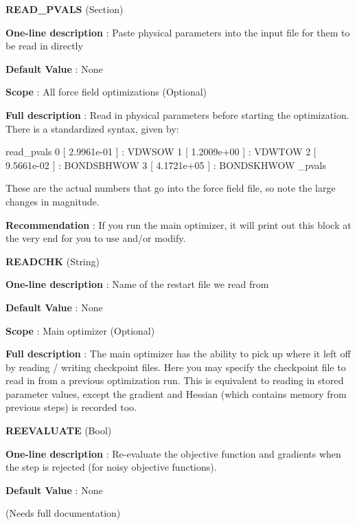 \begin{DoxyItemize}
\item {\bfseries  R\-E\-A\-D\-\_\-\-P\-V\-A\-L\-S } (Section) \par
{\bfseries  One-\/line description }\-: Paste physical parameters into the input file for them to be read in directly \par
{\bfseries  Default Value }\-: None \par
{\bfseries  Scope }\-: All force field optimizations (Optional) \par
{\bfseries  Full description }\-: Read in physical parameters before starting the optimization. There is a standardized syntax, given by\-: \begin{DoxyVerb}read_pvals
 0 [  2.9961e-01 ] : VDWSOW
 1 [  1.2009e+00 ] : VDWTOW
 2 [  9.5661e-02 ] : BONDSBHWOW
 3 [  4.1721e+05 ] : BONDSKHWOW
 \read_pvals \end{DoxyVerb}
 These are the actual numbers that go into the force field file, so note the large changes in magnitude. \par
{\bfseries  Recommendation }\-: If you run the main optimizer, it will print out this block at the very end for you to use and/or modify.\end{DoxyItemize}
\begin{DoxyItemize}
\item {\bfseries  R\-E\-A\-D\-C\-H\-K } (String) \par
{\bfseries  One-\/line description }\-: Name of the restart file we read from \par
{\bfseries  Default Value }\-: None \par
{\bfseries  Scope }\-: Main optimizer (Optional) \par
{\bfseries  Full description }\-: The main optimizer has the ability to pick up where it left off by reading / writing checkpoint files. Here you may specify the checkpoint file to read in from a previous optimization run. This is equivalent to reading in stored parameter values, except the gradient and Hessian (which contains memory from previous steps) is recorded too.\end{DoxyItemize}
\begin{DoxyItemize}
\item {\bfseries  R\-E\-E\-V\-A\-L\-U\-A\-T\-E } (Bool) \par
{\bfseries  One-\/line description }\-: Re-\/evaluate the objective function and gradients when the step is rejected (for noisy objective functions). \par
{\bfseries  Default Value }\-: None \par
(Needs full documentation)\end{DoxyItemize}
